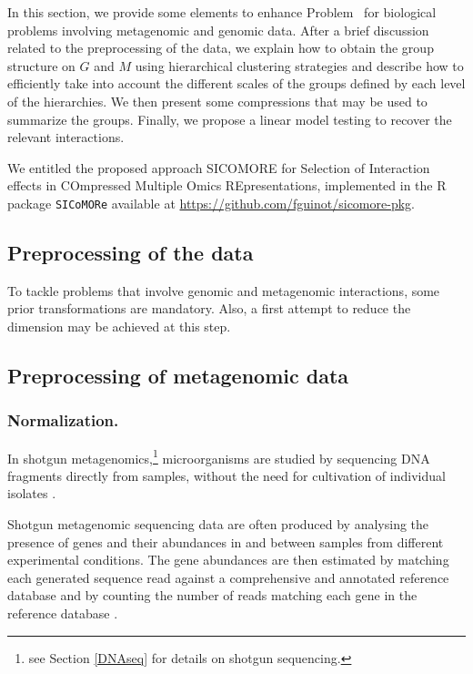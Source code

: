 \documentclass[]{book}
\let\rmarkdownfootnote\footnote%
\def\footnote{\protect\rmarkdownfootnote}
\begin{document}
In this section, we provide some elements to enhance Problem~ for
biological problems involving metagenomic and genomic data. After a
brief discussion related to the preprocessing of the data, we explain
how to obtain the group structure on \(\mathit{G}\) and \(\mathit{M}\) using hierarchical
clustering strategies and describe how to efficiently take into account
the different scales of the groups defined by each level of the
hierarchies. We then present some compressions that may be used to
summarize the groups. Finally, we propose a linear model testing to
recover the relevant interactions.

We entitled the proposed approach SICOMORE for Selection of Interaction
effects in COmpressed Multiple Omics REpresentations, implemented in the
R package \texttt{SICoMORe} available at \url{https://github.com/fguinot/sicomore-pkg}.

\hypertarget{preprocess}{%
\subsection{Preprocessing of the data}\label{preprocess}}

To tackle problems that involve genomic and metagenomic interactions,
some prior transformations are mandatory. Also, a first attempt to
reduce the dimension may be achieved at this step.

\hypertarget{preprocessing-of-metagenomic-data}{%
\subsection{Preprocessing of metagenomic data}\label{preprocessing-of-metagenomic-data}}

\hypertarget{normalization.}{%
\subsubsection{Normalization.}\label{normalization.}}

In shotgun metagenomics,\footnote{see Section \ref{DNAseq} for details on shotgun sequencing.} microorganisms are studied by sequencing
DNA fragments directly from samples, without the need for cultivation of
individual isolates \citep{sharpton2014introduction}.

Shotgun metagenomic sequencing data are often produced by analysing the
presence of genes and their abundances in and between samples from
different experimental conditions. The gene abundances are then
estimated by matching each generated sequence read against a
comprehensive and annotated reference database and by counting the
number of reads matching each gene in the reference database
\citep{pereira2018comparison}.
\end{document}
